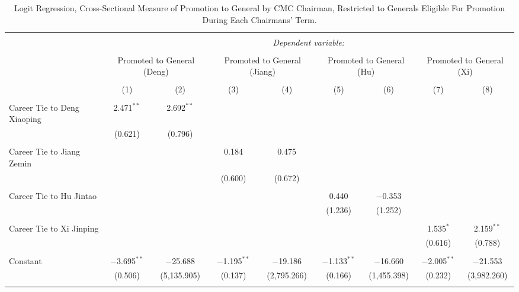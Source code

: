 \documentclass[12pt,letterpaper]{article}
\begin{document}
\begin{table}[!htbp] \centering 
	\caption{Logit Regression, Cross-Sectional Measure of Promotion to General by CMC Chairman, Restricted to Generals Eligible For Promotion During Each Chairmans' Term.} 
	\label{table_a18} 
	\begin{tabular}{@{\extracolsep{5pt}}lcccccccc} 
		\\[-1.8ex]\hline 
		\hline \\[-1.8ex] 
		& \multicolumn{8}{c}{\textit{Dependent variable:}} \\ 
		\cline{2-9} 
		\\[-1.8ex] & \multicolumn{2}{c}{Promoted to General (Deng)} & \multicolumn{2}{c}{Promoted to General (Jiang)} & \multicolumn{2}{c}{Promoted to General (Hu)} & \multicolumn{2}{c}{Promoted to General (Xi)} \\ 
		\\[-1.8ex] & (1) & (2) & (3) & (4) & (5) & (6) & (7) & (8)\\ 
		\hline \\[-1.8ex] 
		Career Tie to Deng Xiaoping & 2.471$^{**}$ & 2.692$^{**}$ &  &  &  &  &  &  \\ 
		& (0.621) & (0.796) &  &  &  &  &  &  \\ 
		& & & & & & & & \\ 
		Career Tie to Jiang Zemin &  &  & 0.184 & 0.475 &  &  &  &  \\ 
		&  &  & (0.600) & (0.672) &  &  &  &  \\ 
		& & & & & & & & \\ 
		Career Tie to Hu Jintao &  &  &  &  & 0.440 & $-$0.353 &  &  \\ 
		&  &  &  &  & (1.236) & (1.252) &  &  \\ 
		& & & & & & & & \\ 
		Career Tie to Xi Jinping &  &  &  &  &  &  & 1.535$^{*}$ & 2.159$^{**}$ \\ 
		&  &  &  &  &  &  & (0.616) & (0.788) \\ 
		& & & & & & & & \\ 
		Constant & $-$3.695$^{**}$ & $-$25.688 & $-$1.195$^{**}$ & $-$19.186 & $-$1.133$^{**}$ & $-$16.660 & $-$2.005$^{**}$ & $-$21.553 \\ 
		& (0.506) & (5,135.905) & (0.137) & (2,795.266) & (0.166) & (1,455.398) & (0.232) & (3,982.260) \\ 
		& & & & & & & & \\ 

\end{tabular}
\end{table}
\end{document}
